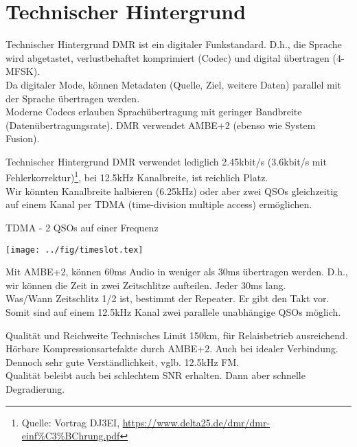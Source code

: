 \documentclass[aspectratio=169]{beamer}
\begin{document}
\section{Technischer Hintergrund}
\begin{frame}{Technischer Hintergrund}
DMR ist ein digitaler Funkstandard. D.h., die Sprache wird abgetastet, verlustbehaftet komprimiert (Codec) und digital übertragen (4-MFSK).\\[0.5cm]

Da digitaler Mode, können Metadaten (Quelle, Ziel, weitere Daten) parallel mit der Sprache übertragen werden.\\[0.5cm]

Moderne Codecs erlauben Sprachübertragung mit geringer Bandbreite (Datenübertragungsrate). DMR verwendet AMBE+2 (ebenso wie System Fusion).\\[0.5cm]
\end{frame}

\begin{frame}{Technischer Hintergrund}
DMR verwendet lediglich 2.45kbit/s (3.6kbit/s mit Fehlerkorrektur)\footnote{Quelle: Vortrag DJ3EI, \url{https://www.delta25.de/dmr/dmr-einf\%C3\%BChrung.pdf}}, bei 12.5kHz Kanalbreite, ist reichlich Platz.\\[0.5cm]

Wir könnten Kanalbreite halbieren (6.25kHz) oder aber zwei QSOs gleichzeitig auf einem Kanal per TDMA (time-division multiple access) ermöglichen.\\[0.5cm]
\end{frame}

\begin{frame}{TDMA - 2 QSOs auf einer Frequenz}
\begin{center}
 \texttt{[image: ../fig/timeslot.tex]}
\end{center}
 Mit AMBE+2, können 60ms Audio in weniger als 30ms übertragen werden. D.h., wir können die Zeit in zwei Zeitschlitze aufteilen. Jeder 30ms lang.\\[0.5cm]
 
 Was/Wann Zeitschlitz 1/2 ist, bestimmt der Repeater. Er gibt den Takt vor. \\[0.5cm]
 
 Somit sind auf einem 12.5kHz Kanal zwei parallele unabhängige QSOs möglich.
\end{frame}

\begin{frame}{Qualität und Reichweite}
 Technisches Limit 150km, für Relaisbetrieb ausreichend.\\[0.5cm]
 
 Hörbare Kompressionsartefakte durch AMBE+2. Auch bei idealer Verbindung. Dennoch sehr gute Verständlichkeit, vglb. 12.5kHz FM. \\[0.5cm]
 
 Qualität beleibt auch bei schlechtem SNR erhalten. Dann aber schnelle Degradierung.
\end{frame}
\end{document}
